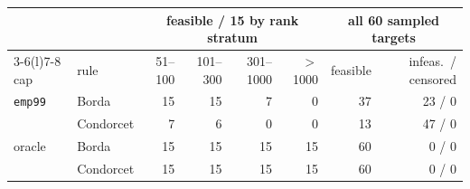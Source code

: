 \begingroup\footnotesize\setlength{\tabcolsep}{3pt}
\begin{tabular}{@{}llrrrrrr@{}}
\toprule
 & & \multicolumn{4}{c}{feasible / 15 by rank stratum} & \multicolumn{2}{c}{all 60 sampled targets} \\
\cmidrule(lr){3-6}\cmidrule(l){7-8}
cap & rule & 51--100 & 101--300 & 301--1000 & $>$1000 & feasible & infeas.\ / censored \\
\midrule
\texttt{emp99} & Borda & 15 & 15 & 7 & 0 & 37 & 23 / 0 \\
 & Condorcet & 7 & 6 & 0 & 0 & 13 & 47 / 0 \\
\addlinespace[2pt]
oracle & Borda & 15 & 15 & 15 & 15 & 60 & 0 / 0 \\
 & Condorcet & 15 & 15 & 15 & 15 & 60 & 0 / 0 \\
\bottomrule
\end{tabular}\endgroup

